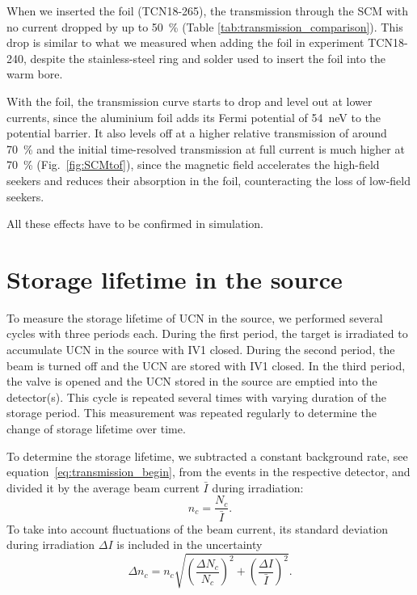 \documentclass[10pt,letterpaper]{article}
\begin{document}
When we inserted the foil (TCN18-265), the transmission through the SCM with no current dropped by up to \SI{50}{\percent} (Table \ref{tab:transmission_comparison}). This drop is similar to what we measured when adding the foil in experiment TCN18-240, despite the stainless-steel ring and solder used to insert the foil into the warm bore.

With the foil, the transmission curve starts to drop and level out at lower currents, since the aluminium foil adds its Fermi potential of \SI{54}{\nano\electronvolt} to the potential barrier. It also levels off at a higher relative transmission of around \SI{70}{\percent} and the initial time-resolved transmission at full current is much higher at \SI{70}{\percent} (Fig.~\ref{fig:SCMtof}), since the magnetic field accelerates the high-field seekers and reduces their absorption in the foil, counteracting the loss of low-field seekers.

All these effects have to be confirmed in simulation.




\section{Storage lifetime in the source}
\label{sec:storagelifetime}

To measure the storage lifetime of UCN in the source, we performed several cycles with three periods each. During the first period, the target is irradiated to accumulate UCN in the source with IV1 closed. During the second period, the beam is turned off and the UCN are stored with IV1 closed. In the third period, the valve is opened and the UCN stored in the source are emptied into the detector(s). This cycle is repeated several times with varying duration of the storage period. This measurement was repeated regularly to determine the change of storage lifetime over time.

To determine the storage lifetime, we subtracted a constant background rate, see equation~\ref{eq:transmission_begin}, from the events in the respective detector, and divided it by the average beam current $\bar{I}$ during irradiation:
\begin{equation}
n_c = \frac{N_c}{\bar{I}}.
\end{equation}
To take into account fluctuations of the beam current, its standard deviation during irradiation $\Delta I$ is included in the uncertainty
\begin{equation}
\Delta n_c = n_c \sqrt{ \left( \frac{\Delta N_c}{N_c} \right)^2 + \left( \frac{\Delta I}{\bar{I}} \right)^2 }.
\end{equation}
\end{document}
